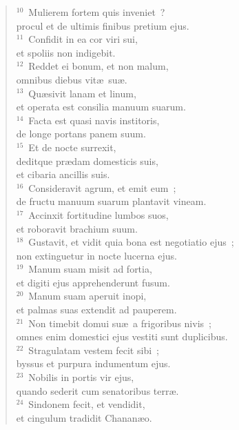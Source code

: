 \begin{flushleft}\begin{verse}${}^{10}$~Mulierem fortem quis inveniet~?\\ procul et de ultimis finibus pretium ejus.\\
${}^{11}$~Confidit in ea cor viri sui,\\ et spoliis non indigebit.\\
${}^{12}$~Reddet ei bonum, et non malum,\\ omnibus diebus vit\ae\ su\ae .\\
${}^{13}$~Qu\ae sivit lanam et linum,\\ et operata est consilia manuum suarum.\\
${}^{14}$~Facta est quasi navis institoris,\\ de longe portans panem suum.\\
${}^{15}$~Et de nocte surrexit,\\ deditque pr\ae dam domesticis suis,\\ et cibaria ancillis suis.\\
${}^{16}$~Consideravit agrum, et emit eum~;\\ de fructu manuum suarum plantavit vineam.\\
${}^{17}$~Accinxit fortitudine lumbos suos,\\ et roboravit brachium suum.\\
${}^{18}$~Gustavit, et vidit quia bona est negotiatio ejus~;\\ non extinguetur in nocte lucerna ejus.\\
${}^{19}$~Manum suam misit ad fortia,\\ et digiti ejus apprehenderunt fusum.\\
${}^{20}$~Manum suam aperuit inopi,\\ et palmas suas extendit ad pauperem.\\
${}^{21}$~Non timebit domui su\ae\ a frigoribus nivis~;\\ omnes enim domestici ejus vestiti sunt duplicibus.\\
${}^{22}$~Stragulatam vestem fecit sibi~;\\ byssus et purpura indumentum ejus.\\
${}^{23}$~Nobilis in portis vir ejus,\\ quando sederit cum senatoribus terr\ae .\\
${}^{24}$~Sindonem fecit, et vendidit,\\ et cingulum tradidit Chanan\ae o.\\

\end{verse}
\end{flushleft}
